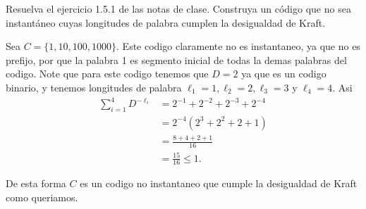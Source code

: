 
Resuelva el ejercicio 1.5.1 de las notas de clase.
Construya un código que no sea instantáneo cuyas longitudes  de palabra cumplen la desigualdad de Kraft.
\begin{sols}
Sea $C=\{1,10,100,1000\}$. Este codigo claramente no es instantaneo, ya que no es prefijo, por que la palabra 1 es segmento inicial de todas la demas palabras del codigo. Note que para este codigo tenemos que $D=2$ ya que es un codigo binario, y tenemos longitudes de palabra $\ell_1=1,\ell_2=2,\ell_3=3$ y $\ell_4=4.$ Asi
\begin{align*}
       \sum_{i=1}^4 D^{-\ell_i}&=2^{-1}+2^{-2}+2^{-3}+2^{-4}\\
       &=2^{-4}(2^3+2^2+2+1)\\
       &=\frac{8+4+2+1}{16}\\
       &=\frac{15}{16}\leq 1.
   \end{align*} 

   De esta forma $C$ es un codigo no instantaneo que cumple la desigualdad de Kraft como queriamos.  
\end{sols}
